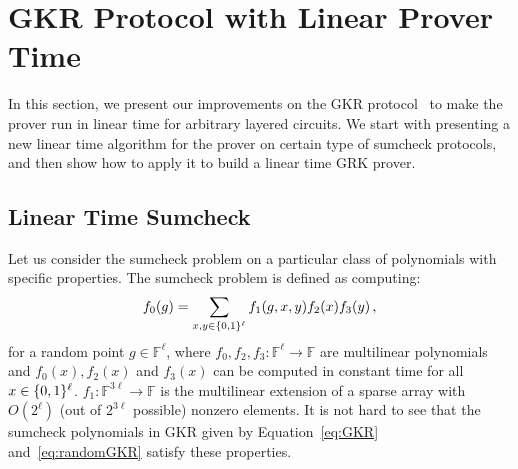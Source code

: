 \section{GKR Protocol with Linear Prover Time}
\label{sec::gkrlin}

In this section, we present our improvements on the GKR protocol~\cite{GKR} to make the prover run in linear time for arbitrary layered circuits. We start with presenting a new linear time algorithm for the prover on certain type of sumcheck protocols, and then show how to apply it to build a linear time GRK prover.

\subsection{Linear Time Sumcheck}

Let us consider the sumcheck problem on a particular class of polynomials with specific properties. The sumcheck problem is defined as computing:
\begin{equation}\label{eq:linearsc}
f_0(g) = \sum\limits_{x,y\in\{0,1\}^\ell}f_1(g,x,y)f_2(x)f_3(y)\, ,
\end{equation}
for a random point $g\in\mathbb{F}^\ell$, where $f_0,f_2,f_3: \mathbb{F}^\ell\rightarrow\mathbb{F}$ are multilinear polynomials and $f_0(x), f_2(x)$ and $f_3(x)$ can be computed in constant time for all $x\in\{0,1\}^\ell$. $f_1:\mathbb{F}^{3\ell}\rightarrow\mathbb{F}$ is the multilinear extension of a sparse array with $O(2^\ell)$ (out of $2^{3\ell}$ possible) nonzero elements. 
It is not hard to see that the sumcheck polynomials in GKR given by Equation~\ref{eq:GKR} and~\ref{eq:randomGKR} satisfy these properties.


